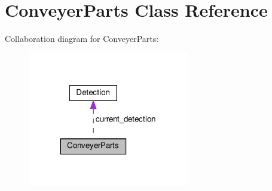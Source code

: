 \hypertarget{classConveyerParts}{}\section{Conveyer\+Parts Class Reference}
\label{classConveyerParts}


Collaboration diagram for Conveyer\+Parts\+:
\nopagebreak
\begin{figure}[H]
\begin{center}
\leavevmode
\includegraphics[width=200pt]{classConveyerParts__coll__graph}
\end{center}
\end{figure}
